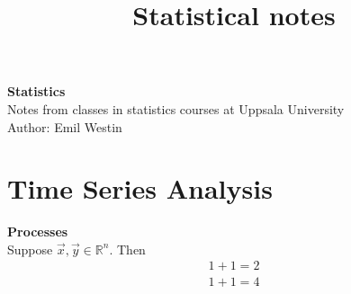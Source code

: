 \documentclass[11pt]{article}
\begin{document}
\title{Statistical notes}

\thispagestyle{empty}

\begin{center}
{\LARGE \bf Statistics}\\
Notes from classes in statistics courses at Uppsala University \\
Author: Emil Westin
\end{center}

\section{Time Series Analysis}

\textbf{Processes}\\

Suppose $\vec{x},\vec{y} \in \mathbb{R}^n$. Then 
\begin{align}
1+1 = 2 \label{MA1} \\
1+1 = 4 \label{MA2} \\
\end{align}
\end{document}
